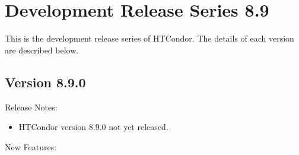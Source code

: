 
\section{Development Release Series 8.9}\label{sec:History-8-9}

This is the development release series of HTCondor.
The details of each version are described below.

\subsection*{\label{sec:New-8-9-0}Version 8.9.0}

\noindent Release Notes:

\begin{itemize}

\item HTCondor version 8.9.0 not yet released.

\end{itemize}


\noindent New Features:


